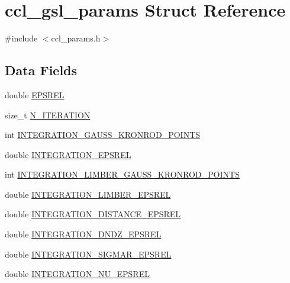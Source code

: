 \hypertarget{structccl__gsl__params}{}\section{ccl\+\_\+gsl\+\_\+params Struct Reference}
\label{structccl__gsl__params}


{\ttfamily \#include $<$ccl\+\_\+params.\+h$>$}

\subsection*{Data Fields}
\begin{DoxyCompactItemize}
\item 
double \mbox{\hyperlink{structccl__gsl__params_adb9fee16dc600f05838baead9d45bc12}{E\+P\+S\+R\+EL}}
\item 
size\+\_\+t \mbox{\hyperlink{structccl__gsl__params_a3d4b0770fae9aee9532d1eec1a746e29}{N\+\_\+\+I\+T\+E\+R\+A\+T\+I\+ON}}
\item 
int \mbox{\hyperlink{structccl__gsl__params_ab7e95b914fb0d624d0fbacb2839c9d02}{I\+N\+T\+E\+G\+R\+A\+T\+I\+O\+N\+\_\+\+G\+A\+U\+S\+S\+\_\+\+K\+R\+O\+N\+R\+O\+D\+\_\+\+P\+O\+I\+N\+TS}}
\item 
double \mbox{\hyperlink{structccl__gsl__params_a3ff3cc499e2749ba6338e09d8fe6d7b3}{I\+N\+T\+E\+G\+R\+A\+T\+I\+O\+N\+\_\+\+E\+P\+S\+R\+EL}}
\item 
int \mbox{\hyperlink{structccl__gsl__params_a7d3af7791d000e52ec3e2dee7d5cb603}{I\+N\+T\+E\+G\+R\+A\+T\+I\+O\+N\+\_\+\+L\+I\+M\+B\+E\+R\+\_\+\+G\+A\+U\+S\+S\+\_\+\+K\+R\+O\+N\+R\+O\+D\+\_\+\+P\+O\+I\+N\+TS}}
\item 
double \mbox{\hyperlink{structccl__gsl__params_a4ac4468ad1a81aa9aa007980db4fb6fe}{I\+N\+T\+E\+G\+R\+A\+T\+I\+O\+N\+\_\+\+L\+I\+M\+B\+E\+R\+\_\+\+E\+P\+S\+R\+EL}}
\item 
double \mbox{\hyperlink{structccl__gsl__params_ac4e4045cb45a81212b56965e1992681f}{I\+N\+T\+E\+G\+R\+A\+T\+I\+O\+N\+\_\+\+D\+I\+S\+T\+A\+N\+C\+E\+\_\+\+E\+P\+S\+R\+EL}}
\item 
double \mbox{\hyperlink{structccl__gsl__params_a1137a9984da996b34916c1ea31bdf689}{I\+N\+T\+E\+G\+R\+A\+T\+I\+O\+N\+\_\+\+D\+N\+D\+Z\+\_\+\+E\+P\+S\+R\+EL}}
\item 
double \mbox{\hyperlink{structccl__gsl__params_ad1542f0ceecfe7f108ce9ccc101f7a12}{I\+N\+T\+E\+G\+R\+A\+T\+I\+O\+N\+\_\+\+S\+I\+G\+M\+A\+R\+\_\+\+E\+P\+S\+R\+EL}}
\item 
double \mbox{\hyperlink{structccl__gsl__params_abe6b11c3bd984ea0168c16ceb9151c15}{I\+N\+T\+E\+G\+R\+A\+T\+I\+O\+N\+\_\+\+N\+U\+\_\+\+E\+P\+S\+R\+EL}}

\end{DoxyCompactItemize}
